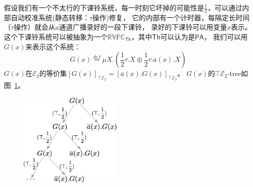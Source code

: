 \begin{example}\label{eg:1}
      假设我们有一个不太行的下课铃系统，每一时刻它坏掉的可能性是$\frac{1}{2}$，可以通过内部自动校准系统(静态转移：$\tau$操作)修复，
      它的内部有一个计时器，每隔定长时间（$\tau$操作）就会从$a$通道广播录好的一段下课铃，
      录好的下课铃可以用变量$x$表示。
      这个下课铃系统可以被抽象为一个$\mathbb{RVPC}_{\mathsf{Th}}$，其中$\mathsf{Th}$可以认为是$\mathsf{PA}$，
      我们可以用$G(x)$来表示这个系统：
      $$G(x)\stackrel{def}{=}\mu X.(\frac{1}{2}\tau.X\oplus \frac{1}{2}\tau.\overline{a}(x).X)$$
      $G(x)$在$\mathcal{E}_2$的等价集$[G(x)]_{\top\mathcal{E}_2} = [\overline{a}(x).G(x)]_{\top\mathcal{E}_2}$。
      $G(x)$的$\top \mathcal{E}_2$-tree如图~\ref{fig_eg1}。
      \begin{figure}[!htbp]
         \small
         \centering
         \includegraphics[width=5cm]{../figure/example1.png}
         \caption[]{} 
         \label{fig_eg1}
      \end{figure}
\end{example}
